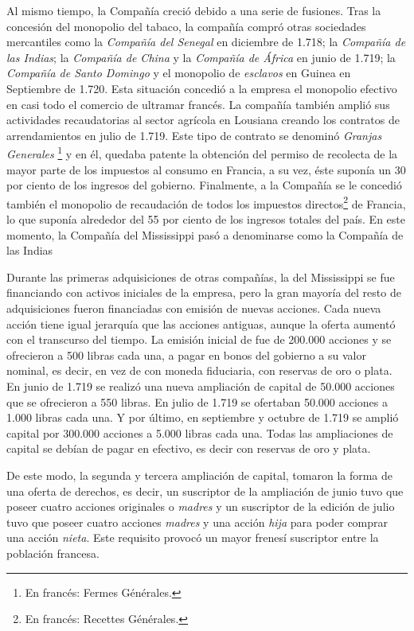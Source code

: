 Al mismo tiempo, la Compañía creció debido a una serie de fusiones. Tras la concesión del monopolio del tabaco, la compañía compró otras sociedades mercantiles como la \emph{Compañía del Senegal} en diciembre de 1.718; la \emph{Compañía de las Indias}; la \emph{Compañía de China} y la \emph{Compañía de África} en junio de 1.719; la \emph{Compañía de Santo Domingo} y el monopolio de \emph{esclavos} en Guinea en Septiembre de 1.720. Esta situación concedió a la empresa el monopolio efectivo en casi todo el comercio de ultramar francés. La compañía también amplió sus actividades recaudatorias al sector agrícola en Lousiana creando los contratos de arrendamientos en julio de 1.719. Este tipo de contrato se denominó \emph{Granjas Generales} \footnote{En francés: Fermes Générales.} y en él, quedaba patente la obtención del permiso de recolecta de la mayor parte de los impuestos al consumo en Francia, a su vez, éste suponía un 30 por ciento de los ingresos del gobierno. Finalmente, a la Compañía se le concedió también el monopolio de recaudación de todos los impuestos directos\footnote{En francés: Recettes Générales.} de Francia, lo que suponía alrededor del 55 por ciento de los ingresos totales del país. En este momento, la Compañía del Mississippi pasó a denominarse como la Compañía de las Indias

Durante las primeras adquisiciones de otras compañías, la del Mississippi se fue financiando con activos iniciales de la empresa, pero la gran mayoría del resto de adquisiciones fueron financiadas con emisión de nuevas acciones. Cada nueva acción tiene igual jerarquía que las acciones antiguas, aunque la oferta aumentó con el transcurso del tiempo. La emisión inicial de fue de 200.000 acciones y se ofrecieron a 500 libras cada una, a pagar en bonos del gobierno a su valor nominal, es decir, en vez de con moneda fiduciaria, con reservas de oro o plata. En junio de 1.719 se realizó una nueva ampliación de capital de 50.000 acciones que se ofrecieron a 550 libras. En julio de 1.719 se ofertaban 50.000 acciones a 1.000 libras cada una. Y por último, en septiembre y octubre de 1.719 se amplió capital por 300.000 acciones a 5.000 libras cada una. Todas las ampliaciones de capital se debían de pagar en efectivo, es decir con reservas de oro y plata. 

De este modo, la segunda y tercera ampliación de capital, tomaron la forma de una oferta de derechos, es decir, un suscriptor de la ampliación de junio tuvo que poseer cuatro acciones originales o \emph{madres} y un suscriptor de la edición de julio tuvo que poseer cuatro acciones \emph{madres} y una acción \emph{hija} para poder comprar una acción \emph{nieta}. Este requisito provocó un mayor frenesí suscriptor  entre la población francesa.

